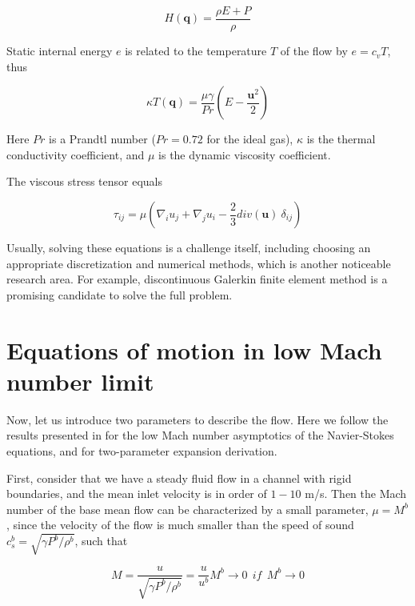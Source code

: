 \begin{equation}
    H(\textbf{q}) = \frac{\rho E + P}{\rho} 
\end{equation}

Static internal energy $e$ is related to the temperature $T$ of the flow by $e = c_v T$, thus

\begin{equation}
    \kappa T(\textbf{q}) = \frac{\mu \gamma}{Pr} \left(E - \frac{\textbf{u}^2}{2}  \right)
\end{equation}

Here $Pr$ is a Prandtl number ($Pr = 0.72$ for the ideal gas), $\kappa$ is the thermal conductivity coefficient, and $\mu$ is the dynamic viscosity coefficient.
 
The viscous stress tensor equals

\begin{equation}
    \tau_{ij} = \mu \left( \nabla_i u_j + \nabla_j u_i - \frac{2}{3} div(\textbf{u}) \  \delta_{ij} \right)
\end{equation}

Usually, solving these equations is a challenge itself, including choosing an appropriate discretization and numerical methods, which is another noticeable research area. For example, discontinuous Galerkin finite element method \cite{hartmann2008} is a promising candidate to solve the full problem.

\section{Equations of motion in low Mach number limit}

Now, let us introduce two parameters to describe the flow. Here we follow the results presented in \cite{Muller99lowmach} for the low Mach number asymptotics of the Navier-Stokes equations, and \cite{culick2006unsteady} for two-parameter expansion derivation. 

First, consider that we have a steady fluid flow in a channel with rigid boundaries, and the mean inlet velocity is in order of $1-10$ m/s. Then the Mach number of the base mean flow can be characterized by a small parameter, $\mu = M^b$, since the velocity of the flow is much smaller than the speed of sound $c_s^b = \sqrt{\gamma P^{b}/\rho^{b}}$, such that

\begin{equation}
M = \frac{u}{\sqrt{\gamma P^{b}/\rho^{b}}} = \frac{u}{u^{b}} M^{b} \rightarrow 0 \ \ if \ \ M^{b} \rightarrow 0
\end{equation}

